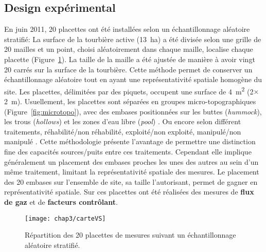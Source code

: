 \subsection{Design expérimental}

En juin 2011, 20 placettes ont été installées selon un échantillonnage aléatoire stratifié:
La surface de la tourbière active (\SI{13}{\hectare}) a été divisée selon une grille de 20 mailles et un point, choisi aléatoirement dans chaque maille, localise chaque placette (Figure~\ref{fig:carteVS}).
La taille de la maille a été ajustée de manière à avoir vingt 20 carrés sur la surface de la tourbière.
Cette méthode permet de conserver un échantillonnage aléatoire tout en ayant une représentativité spatiale homogène du site. 
Les placettes, délimitées par des piquets, occupent une surface de \SI{4}{\square\metre} (2$\times$\SI{2}{\metre}).
Usuellement, les placettes sont séparées en groupes micro-topographiques (Figure~\ref{fig:microtopo}), avec des embases positionnées sur les buttes (\textit{hummock}), les trous (\textit{hollows}) et les zones d'eau libre (\textit{pool}) \citep{Alm1997,waddington2000}.
Ou encore selon différent traitements, réhabilité/non réhabilité, exploité/non exploité, manipulé/non manipulé \citep{bortoluzzi2006a,strack2013}.
Cette méthodologie présente l'avantage de permettre une distinction fine des capacités sources/puits entre ces traitements.
Cependant elle implique généralement un placement des embases proches les unes des autres au sein d'un même traitement, limitant la représentativité spatiale des mesures.
Le placement des 20 embases sur l'ensemble de site, sa taille l'autorisant, permet de gagner en représentativité spatiale.
Sur ces placettes ont été réalisées des mesures de \textbf{flux de gaz} et de \textbf{facteurs contrôlant}.

\begin{figure}
\centering
\texttt{[image: chap3/carteVS]}
\caption{Répartition des 20 placettes de mesures suivant un échantillonnage aléatoire stratifié.}
\label{fig:carteVS}
\end{figure}


